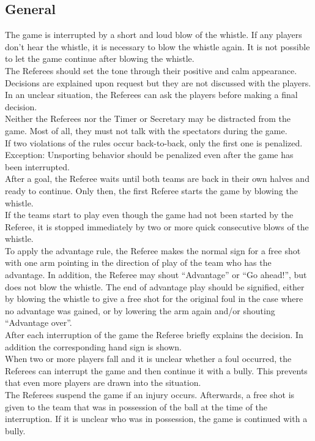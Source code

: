 \subsection{General}
The game is interrupted by a short and loud blow of the whistle. If any players don’t hear the whistle, it is necessary to
blow the whistle again. It is not possible to let the game continue after blowing the whistle.\\
The Referees should set the tone through their positive and calm appearance. Decisions are explained upon request but
they are not discussed with the players. In an unclear situation, the Referees can ask the players before making a final
decision.\\
Neither the Referees nor the Timer or Secretary may be distracted from the game. Most of all, they must not talk with
the spectators during the game.\\
If two violations of the rules occur back-to-back, only the first one is penalized. Exception: Unsporting behavior should
be penalized even after the game has been interrupted.\\
After a goal, the Referee waits until both teams are back in their own halves and ready to continue. Only then, the first
Referee starts the game by blowing the whistle.\\
If the teams start to play even though the game had not been started by the Referee, it is stopped immediately by two or
more quick consecutive blows of the whistle.\\
To apply the advantage rule, the Referee makes the normal sign for a free shot with one arm pointing in the direction of
play of the team who has the advantage. In addition, the Referee may shout ``Advantage'' or ``Go ahead!'', but does not
blow the whistle. The end of advantage play should be signified, either by blowing the whistle to give a free shot for
the original foul in the case where no advantage was gained, or by lowering the arm again and/or shouting ``Advantage
over''.\\
After each interruption of the game the Referee briefly explains the decision. In addition the corresponding hand sign is
shown.\\
When two or more players fall and it is unclear whether a foul occurred, the Referees can interrupt the game and then
continue it with a bully. This prevents that even more players are drawn into the situation.\\
The Referees suspend the game if an injury occurs. Afterwards, a free shot is given to the team that was in possession
of the ball at the time of the interruption. If it is unclear who was in possession, the game is continued with a bully.

